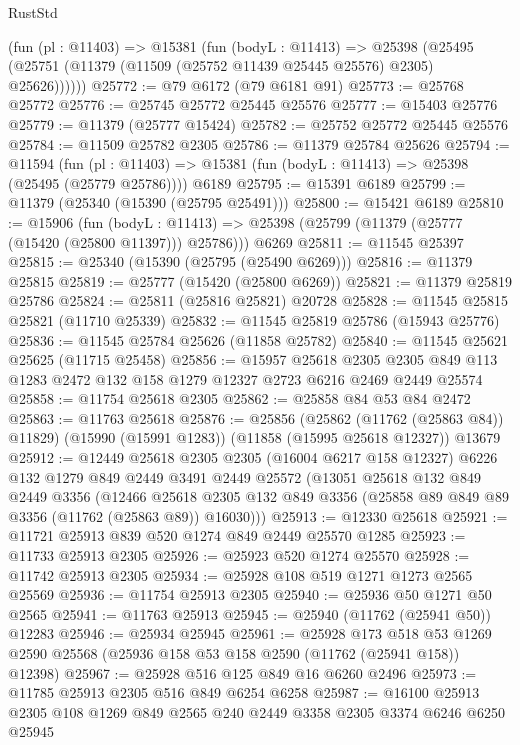 \begin{lexlean}{RustStd}
\begin{coremodule}
      (fun (pl : @11403) =>
      @15381
        (fun (bodyL : @11413) =>
        @25398 (@25495 (@25751 (@11379 (@11509 (@25752 @11439 @25445 @25576) @2305) @25626))))))
@25772 := @79 @6172 (@79 @6181 @91)
@25773 := @25768 @25772
@25776 := @25745 @25772 @25445 @25576
@25777 := @15403 @25776
@25779 := @11379 (@25777 @15424)
@25782 := @25752 @25772 @25445 @25576
@25784 := @11509 @25782 @2305
@25786 := @11379 @25784 @25626
@25794 := @11594
    (fun (pl : @11403) => @15381 (fun (bodyL : @11413) => @25398 (@25495 (@25779 @25786))))
    @6189
@25795 := @15391 @6189
@25799 := @11379 (@25340 (@15390 (@25795 @25491)))
@25800 := @15421 @6189
@25810 := @15906
    (fun (bodyL : @11413) => @25398 (@25799 (@11379 (@25777 (@15420 (@25800 @11397))) @25786)))
    @6269
@25811 := @11545 @25397
@25815 := @25340 (@15390 (@25795 (@25490 @6269)))
@25816 := @11379 @25815
@25819 := @25777 (@15420 (@25800 @6269))
@25821 := @11379 @25819 @25786
@25824 := @25811 (@25816 @25821) @20728
@25828 := @11545 @25815 @25821 (@11710 @25339)
@25832 := @11545 @25819 @25786 (@15943 @25776)
@25836 := @11545 @25784 @25626 (@11858 @25782)
@25840 := @11545 @25621 @25625 (@11715 @25458)
@25856 := @15957
    @25618
    @2305
    @2305
    @849
    @113
    @1283
    @2472
    @132
    @158
    @1279
    @12327
    @2723
    @6216
    @2469
    @2449
    @25574
@25858 := @11754 @25618 @2305
@25862 := @25858 @84 @53 @84 @2472
@25863 := @11763 @25618
@25876 := @25856
    (@25862 (@11762 (@25863 @84)) @11829)
    (@15990 (@15991 @1283))
    (@11858 (@15995 @25618 @12327))
    @13679
@25912 := @12449
    @25618
    @2305
    @2305
    (@16004 @6217 @158 @12327)
    @6226
    @132
    @1279
    @849
    @2449
    @3491
    @2449
    @25572
    (@13051
      @25618
      @132
      @849
      @2449
      @3356
      (@12466
        @25618
        @2305
        @132
        @849
        @3356
        (@25858 @89 @849 @89 @3356 (@11762 (@25863 @89)) @16030)))
@25913 := @12330 @25618
@25921 := @11721 @25913 @839 @520 @1274 @849 @2449 @25570 @1285
@25923 := @11733 @25913 @2305
@25926 := @25923 @520 @1274 @25570
@25928 := @11742 @25913 @2305
@25934 := @25928 @108 @519 @1271 @1273 @2565 @25569
@25936 := @11754 @25913 @2305
@25940 := @25936 @50 @1271 @50 @2565
@25941 := @11763 @25913
@25945 := @25940 (@11762 (@25941 @50)) @12283
@25946 := @25934 @25945
@25961 := @25928
    @173
    @518
    @53
    @1269
    @2590
    @25568
    (@25936 @158 @53 @158 @2590 (@11762 (@25941 @158)) @12398)
@25967 := @25928 @516 @125 @849 @16 @6260 @2496
@25973 := @11785 @25913 @2305 @516 @849 @6254 @6258
@25987 := @16100 @25913 @2305 @108 @1269 @849 @2565 @240 @2449 @3358 @2305 @3374 @6246 @6250 @25945

\end{coremodule}
\end{lexlean}
